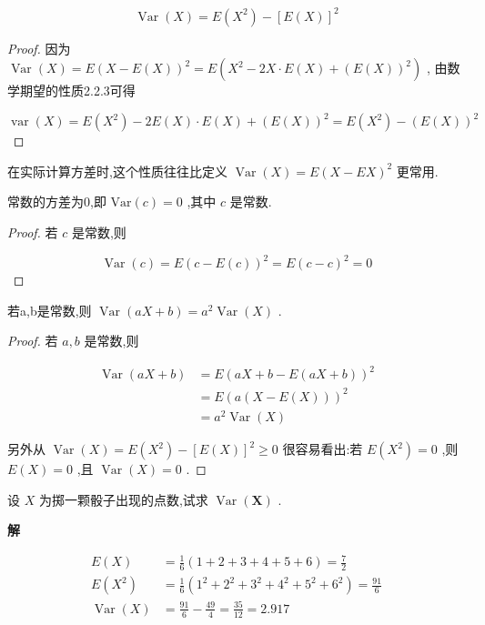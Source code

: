 \begin{property}
	\[
	\operatorname{Var}(X)=E\left(X^{2}\right)-[E(X)]^{2}
	\]
	
	\begin{proof}
		因为 $ \operatorname{Var}(X)=E(X-E(X))^{2}=E\left(X^{2}-2 X \cdot E(X)+(E(X))^{2}\right) $ , 由数学期望的性质2.2.3可得
		
		\[
		\operatorname{var}(X)=E\left(X^{2}\right)-2 E(X) \cdot E(X)+(E(X))^{2}=E\left(X^{2}\right)-(E(X))^{2}
		\]
		
	\end{proof}	
	
	在实际计算方差时,这个性质往往比定义 $ \operatorname{Var}(X)=E(X-E X)^{2} $ 更常用.
	
\end{property}

\begin{property}
	常数的方差为0,即 $ \mathrm{Var}(c)=0 $ ,其中 $ c $ 是常数.
\end{property}

\begin{proof}
	若 $ c $ 是常数,则
	
	\[
	\operatorname{Var}(c)=E(c-E(c))^{2}=E(c-c)^{2}=0
	\]
	
\end{proof}	


\begin{property}
	若a,b是常数,则 $ \operatorname{Var}(a X+b)=a^{2} \operatorname{Var}(X) $ .
\end{property}

\begin{proof}
	若 $ a,b $ 是常数,则
	
	\[
	\begin{aligned} \operatorname{Var}(a X+b) &=E(a X+b-E(a X+b))^{2} \\ &=E(a(X-E(X)))^{2} \\ &=a^{2} \operatorname{Var}(X) \end{aligned}
	\]
	
	另外从 $ \operatorname{Var}(X)=E\left(X^{2}\right)-[E(X)]^{2} \geqslant 0 $ 很容易看出:若 $ E(X^2)=0 $ ,则 $ E(X)=0 $ ,且 $ \operatorname{Var}(X)=0 $ .
	
\end{proof}

\begin{example}\label{exam:2.3.3}
	设 $ X $ 为掷一颗骰子出现的点数,试求 $ \operatorname{Var}(\boldsymbol{X}) $ .
	
	\textbf{解}
	
	\[
	\begin{array}{rl}
	{E(X)} & {=\frac{1}{6}(1+2+3+4+5+6)=\frac{7}{2}} \\ {E\left(X^{2}\right)} & {=\frac{1}{6}\left(1^{2}+2^{2}+3^{2}+4^{2}+5^{2}+6^{2}\right)=\frac{91}{6}} \\ {\operatorname{Var}(X)} & {=\frac{91}{6}-\frac{49}{4}=\frac{35}{12}=2.917}
	\end{array}
	\]
	
\end{example}

